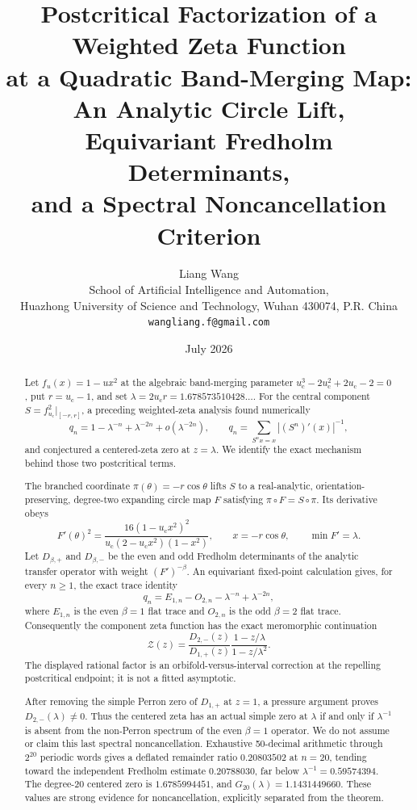 \documentclass[11pt]{article}
\title{\textbf{Postcritical Factorization of a Weighted Zeta Function}\\
\textbf{at a Quadratic Band-Merging Map:}\\
\large An Analytic Circle Lift, Equivariant Fredholm Determinants,\\
and a Spectral Noncancellation Criterion}
\author{Liang Wang\\
\small School of Artificial Intelligence and Automation,\\[-0.2em]
\small Huazhong University of Science and Technology, Wuhan 430074, P.R. China\\
\small \texttt{wangliang.f@gmail.com}}
\date{July 2026}
\theoremstyle{definition}
\theoremstyle{remark}
\newcommand{\uc}{u_{\mathrm c}}
\newcommand{\cZ}{\mathcal Z}
\begin{document}
\maketitle

\begin{abstract}
Let $f_u(x)=1-u x^2$ at the algebraic band-merging parameter
$\uc^3-2\uc^2+2\uc-2=0$, put $r=\uc-1$, and set
$\lambda=2\uc r=1.678573510428\ldots$.  For the central component
$S=f_{\uc}^2|_{[-r,r]}$, a preceding weighted-zeta analysis found
numerically
\[
 q_n=1-\lambda^{-n}+\lambda^{-2n}+o(\lambda^{-2n}),
 \qquad
 q_n=\sum_{S^n x=x}|(S^n)'(x)|^{-1},
\]
and conjectured a centered-zeta zero at $z=\lambda$.  We identify the exact
mechanism behind those two postcritical terms.

The branched coordinate $\pi(\theta)=-r\cos\theta$ lifts $S$ to a
real-analytic, orientation-preserving, degree-two expanding circle map
$F$ satisfying $\pi\circ F=S\circ\pi$.  Its derivative obeys
\[
 F'(\theta)^2=
 \frac{16(1-\uc x^2)^2}
 {\uc(2-\uc x^2)(1-x^2)},
 \qquad x=-r\cos\theta,
 \qquad \min F'=\lambda.
\]
Let $D_{\beta,+}$ and $D_{\beta,-}$ be the even and odd Fredholm
determinants of the analytic transfer operator with weight $(F')^{-\beta}$.
An equivariant fixed-point calculation gives, for every $n\ge1$, the exact
trace identity
\[
 \boxed{q_n=E_{1,n}-O_{2,n}-\lambda^{-n}+\lambda^{-2n}},
\]
where $E_{1,n}$ is the even $\beta=1$ flat trace and $O_{2,n}$ is the odd
$\beta=2$ flat trace.  Consequently the component zeta function has the
exact meromorphic continuation
\[
 \boxed{
 \cZ(z)=\frac{D_{2,-}(z)}{D_{1,+}(z)}
 \frac{1-z/\lambda}{1-z/\lambda^2}.}
\]
The displayed rational factor is an orbifold-versus-interval correction at the
repelling postcritical endpoint; it is not a fitted asymptotic.

After removing the simple Perron zero of $D_{1,+}$ at $z=1$, a pressure
argument proves $D_{2,-}(\lambda)\ne0$.  Thus the centered zeta has an actual
simple zero at $\lambda$ if and only if $\lambda^{-1}$ is absent from the
non-Perron spectrum of the even $\beta=1$ operator.  We do not assume or
claim this last spectral noncancellation.  Exhaustive 50-decimal arithmetic
through $2^{20}$ periodic words gives a deflated remainder ratio
$0.20803502$ at $n=20$, tending toward the independent Fredholm estimate
$0.20788030$, far below $\lambda^{-1}=0.59574394$.  The degree-20 centered
zero is $1.6785994451$, and $G_{20}(\lambda)=1.1431449660$.  These values are
strong evidence for noncancellation, explicitly separated from the theorem.
\end{abstract}
\end{document}

